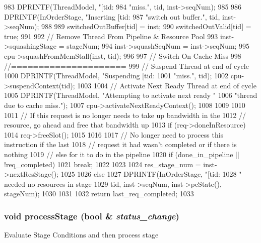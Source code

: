 \begin{DoxyCode}
{{{{{983                     DPRINTF(ThreadModel, "[tid:%
984                             "miss.\n", tid, inst->seqNum);
985 
986                     DPRINTF(InOrderStage, "Inserting [tid:%
987                             "switch out buffer.\n", tid, inst->seqNum);
988 
989                     switchedOutBuffer[tid] = inst;
990                     switchedOutValid[tid] = true;
991                     
992                     // Remove Thread From Pipeline & Resource Pool
993                     inst->squashingStage = stageNum;
994                     inst->squashSeqNum = inst->seqNum;
995                     cpu->squashFromMemStall(inst, tid);  
996 
997                     // Switch On Cache Miss
998                     //=====================
999                     // Suspend Thread at end of cycle
1000                     DPRINTF(ThreadModel, "Suspending [tid:%
1001                             "miss.\n", tid);
1002                     cpu->suspendContext(tid);                    
1003 
1004                     // Activate Next Ready Thread at end of cycle
1005                     DPRINTF(ThreadModel, "Attempting to activate next ready "
1006                             "thread due to cache miss.\n");
1007                     cpu->activateNextReadyContext();
1008                 }
1009             }
1010 
1011             // If this request is no longer needs to take up bandwidth in the
1012             // resource, go ahead and free that bandwidth up
1013             if (req->doneInResource) {
1014                 req->freeSlot();
1015             }
1016 
1017             // No longer need to process this instruction if the last
1018             // request it had wasn't completed or if there is nothing
1019             // else for it to do in the pipeline
1020             if (done_in_pipeline || !req_completed) {
1021                 break;
1022             }
1023 
1024             res_stage_num = inst->nextResStage();
1025         }
1026     } else {
1027         DPRINTF(InOrderStage, "[tid:%
1028                 " needed no resources in stage %
1029                 tid, inst->seqNum, inst->pcState(), stageNum);
1030     }
1031 
1032     return last_req_completed;
1033 }
\end{DoxyCode}
\hypertarget{classPipelineStage_a0782fca2c80ef367ee914d464584ab20}{
\subsubsection[{processStage}]{\setlength{\rightskip}{0pt plus 5cm}void processStage (bool \& {\em status\_\-change})}}
\label{classPipelineStage_a0782fca2c80ef367ee914d464584ab20}
Evaluate Stage Conditions and then process stage 

